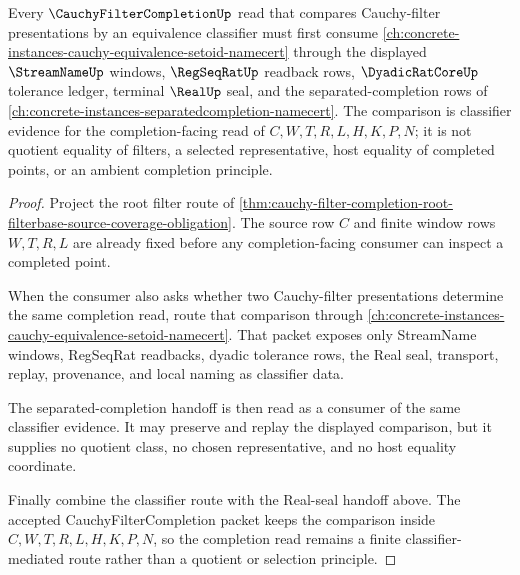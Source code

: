 \begin{theorem}
\label{thm:cauchyfiltercompletion-cauchy-equivalence-classifier-route}
Every $\CauchyFilterCompletionUp$ read that compares Cauchy-filter presentations by an equivalence classifier must first consume \autoref{ch:concrete-instances-cauchy-equivalence-setoid-namecert} through the displayed $\StreamNameUp$ windows, $\RegSeqRatUp$ readback rows, $\DyadicRatCoreUp$ tolerance ledger, terminal $\RealUp$ seal, and the separated-completion rows of \autoref{ch:concrete-instances-separatedcompletion-namecert}. The comparison is classifier evidence for the completion-facing read of $C,W,T,R,L,H,K,P,N$; it is not quotient equality of filters, a selected representative, host equality of completed points, or an ambient completion principle.
\end{theorem}
\begin{proof}
Project the root filter route of \autoref{thm:cauchy-filter-completion-root-filterbase-source-coverage-obligation}. The source row $C$ and finite window rows $W,T,R,L$ are already fixed before any completion-facing consumer can inspect a completed point.

When the consumer also asks whether two Cauchy-filter presentations determine the same completion read, route that comparison through \autoref{ch:concrete-instances-cauchy-equivalence-setoid-namecert}. That packet exposes only StreamName windows, RegSeqRat readbacks, dyadic tolerance rows, the Real seal, transport, replay, provenance, and local naming as classifier data.

The separated-completion handoff is then read as a consumer of the same classifier evidence. It may preserve and replay the displayed comparison, but it supplies no quotient class, no chosen representative, and no host equality coordinate.

Finally combine the classifier route with the Real-seal handoff above. The accepted CauchyFilterCompletion packet keeps the comparison inside $C,W,T,R,L,H,K,P,N$, so the completion read remains a finite classifier-mediated route rather than a quotient or selection principle.
\end{proof}

